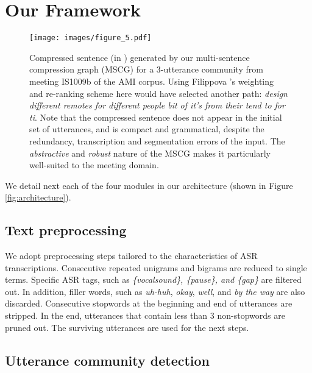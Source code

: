 \documentclass[11pt,a4paper]{article}
\begin{document}
\section{Our Framework} \label{sec:proposed_system}

\begin{figure*}[!ht]
\centering
\captionsetup{size=small}
\begin{minipage}[c]{0.34\textwidth}
\caption{
Compressed sentence (in \textbf{\color{red}{bold red}}) generated by our multi-sentence compression graph (MSCG) for a 3-utterance community from meeting IS1009b of the AMI corpus. Using Filippova 's weighting and re-ranking scheme here would have selected another path: \textit{design different remotes for different people bit of it's from their tend to for ti}. Note that the compressed sentence does not appear in the initial set of utterances, and is compact and grammatical, despite the redundancy, transcription and segmentation errors of the input. The \textit{abstractive} and \textit{robust} nature of the MSCG makes it particularly well-suited to the meeting domain.
} \label{fig:msc_illustration}
\end{minipage}\hfill
\begin{minipage}[c]{0.6\textwidth}
\texttt{[image: images/figure\_5.pdf]}
\end{minipage}

\end{figure*}

We detail next each of the four modules in our architecture (shown in Figure \ref{fig:architecture}).
\subsection{Text preprocessing}
We adopt preprocessing steps tailored to the characteristics of ASR transcriptions. 
Consecutive repeated unigrams and bigrams are reduced to single terms.
Specific ASR tags, such as \textit{\{vocalsound\}, \{pause\}, and \{gap\}} are filtered out.
In addition, filler words, such as \textit{uh-huh}, \textit{okay}, \textit{well}, and \textit{by the way} are also discarded.
Consecutive stopwords at the beginning and end of utterances are stripped.
In the end, utterances that contain less than 3 non-stopwords are pruned out. The surviving utterances are used for the next steps.

\subsection{Utterance community detection} \label{subsec:utterance_community_detection}
\end{document}

